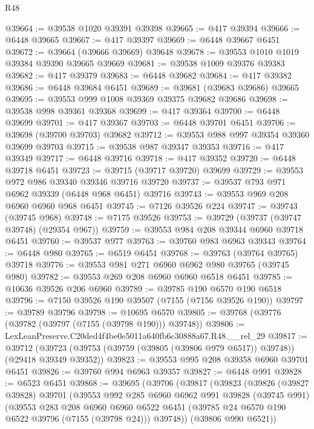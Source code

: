 \begin{lexlean}{R48}
\begin{coremodule}
@39664 := @39538 @1020 @39391 @39398
@39665 := @417 @39394
@39666 := @6448 @39665
@39667 := @417 @39397
@39669 := @6448 @39667 @6451
@39672 := @39664 (@39666 @39669) @39648
@39678 := @39553 @1010 @1019 @39384 @39390 @39665 @39669
@39681 := @39538 @1009 @39376 @39383
@39682 := @417 @39379
@39683 := @6448 @39682
@39684 := @417 @39382
@39686 := @6448 @39684 @6451
@39689 := @39681 (@39683 @39686) @39665
@39695 := @39553 @999 @1008 @39369 @39375 @39682 @39686
@39698 := @39538 @998 @39361 @39368
@39699 := @417 @39364
@39700 := @6448 @39699
@39701 := @417 @39367
@39703 := @6448 @39701 @6451
@39706 := @39698 (@39700 @39703) @39682
@39712 := @39553 @988 @997 @39354 @39360 @39699 @39703
@39715 := @39538 @987 @39347 @39353
@39716 := @417 @39349
@39717 := @6448 @39716
@39718 := @417 @39352
@39720 := @6448 @39718 @6451
@39723 := @39715 (@39717 @39720) @39699
@39729 := @39553 @972 @986 @39340 @39346 @39716 @39720
@39737 := @39537 @793 @971 @6962 @39339 (@6448 @968 @6451) @39716
@39743 := @39553 @969 @208 @6960 @6960 @968 @6451
@39745 := @7126 @39526 @224
@39747 := @39743 (@39745 @968)
@39748 := @7175 @39526
@39753 := @39729 (@39737 (@39747 @39748) (@29354 @967))
@39759 := @39553 @984 @208 @39344 @6960 @39718 @6451
@39760 := @39537 @977
@39763 := @39760 @983 @6963 @39343
@39764 := @6448 @980
@39765 := @6519 @6451
@39768 := @39763 (@39764 @39765) @39718
@39776 := @39553 @981 @271 @6960 @6962 @980 @39765 (@39745 @980)
@39782 := @39553 @269 @208 @6960 @6960 @6518 @6451
@39785 := @10636 @39526 @206 @6960
@39789 := @39785 @190 @6570 @190 @6518
@39796 := @7150 @39526 @190 @39507 (@7155 (@7156 @39526 @190))
@39797 := @39789 @39796
@39798 := @10695 @6570
@39805 := @39768 (@39776 (@39782 (@39797 (@7155 (@39798 @190))) @39748))
@39806 := LexLeanPreserve.C20ded4f4be0e5011a640fb6c30888a67.R48.__rel_29
@39817 := @39712
    (@39723 (@39753 (@39759 (@39805 (@39806 @979 @6517)) @39748)) (@29418 @39349 @39352))
@39823 := @39553 @995 @208 @39358 @6960 @39701 @6451
@39826 := @39760 @994 @6963 @39357
@39827 := @6448 @991
@39828 := @6523 @6451
@39868 := @39695
    (@39706
      (@39817
        (@39823
          (@39826
            (@39827 @39828)
            @39701
            (@39553
              @992
              @285
              @6960
              @6962
              @991
              @39828
              (@39745 @991)
              (@39553
                @283
                @208
                @6960
                @6960
                @6522
                @6451
                (@39785 @24 @6570 @190 @6522 @39796 (@7155 (@39798 @24)))
                @39748))
            (@39806 @990 @6521))

\end{coremodule}
\end{lexlean}
